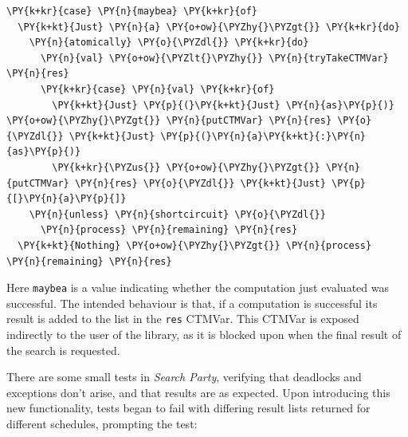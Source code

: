 
\begin{Verbatim}[commandchars=\\\{\}]
\PY{k+kr}{case} \PY{n}{maybea} \PY{k+kr}{of}
  \PY{k+kt}{Just} \PY{n}{a} \PY{o+ow}{\PYZhy{}\PYZgt{}} \PY{k+kr}{do}
    \PY{n}{atomically} \PY{o}{\PYZdl{}} \PY{k+kr}{do}
      \PY{n}{val} \PY{o+ow}{\PYZlt{}\PYZhy{}} \PY{n}{tryTakeCTMVar} \PY{n}{res}
      \PY{k+kr}{case} \PY{n}{val} \PY{k+kr}{of}
        \PY{k+kt}{Just} \PY{p}{(}\PY{k+kt}{Just} \PY{n}{as}\PY{p}{)} \PY{o+ow}{\PYZhy{}\PYZgt{}} \PY{n}{putCTMVar} \PY{n}{res} \PY{o}{\PYZdl{}} \PY{k+kt}{Just} \PY{p}{(}\PY{n}{a}\PY{k+kt}{:}\PY{n}{as}\PY{p}{)}
        \PY{k+kr}{\PYZus{}} \PY{o+ow}{\PYZhy{}\PYZgt{}} \PY{n}{putCTMVar} \PY{n}{res} \PY{o}{\PYZdl{}} \PY{k+kt}{Just} \PY{p}{[}\PY{n}{a}\PY{p}{]}
    \PY{n}{unless} \PY{n}{shortcircuit} \PY{o}{\PYZdl{}}
      \PY{n}{process} \PY{n}{remaining} \PY{n}{res}
  \PY{k+kt}{Nothing} \PY{o+ow}{\PYZhy{}\PYZgt{}} \PY{n}{process} \PY{n}{remaining} \PY{n}{res}
\end{Verbatim}

Here \texttt{maybea} is a value indicating whether the computation
just evaluated was successful. The intended behaviour is that, if a
computation is successful its result is added to the list in the
\texttt{res} CTMVar. This CTMVar is exposed indirectly to the user of
the library, as it is blocked upon when the final result of the search
is requested.

\FloatBarrier

There are some small tests in \textit{Search Party}, verifying that
deadlocks and exceptions don't arise, and that results are as
expected. Upon introducing this new functionality, tests began to fail
with differing result lists returned for different schedules,
prompting the test:


